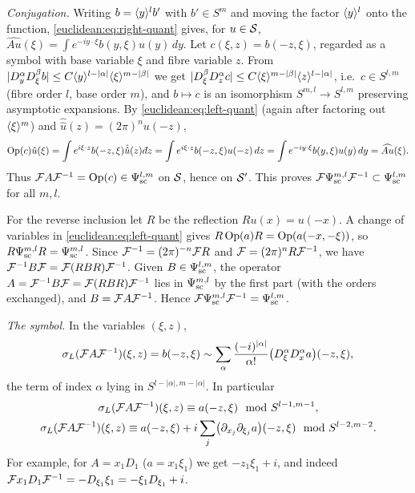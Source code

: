 \emph{Conjugation.} Writing $b=\langle y\rangle^lb'$ with $b'\in S^m$ and moving the
factor $\langle y\rangle^l$ onto the function, \eqref{euclidean:eq:right-quant} gives, for
$u\in\mathcal{S}$,
$\widehat{Au}(\xi)=\int e^{-iy\cdot\xi}b(y,\xi)u(y)\,dy$. Let $c(\xi,z)=b(-z,\xi)$,
regarded as a symbol with base variable $\xi$ and fibre variable $z$. From
$|D_y^\alpha D_\xi^\beta b|\le C\langle y\rangle^{l-|\alpha|}\langle \xi\rangle^{m-|\beta|}$ we get
$|D_\xi^\beta D_z^\alpha c|\le C\langle \xi\rangle^{m-|\beta|}\langle z\rangle^{l-|\alpha|}$, i.e.\
$c\in S^{l,m}$ (fibre order $l$, base order $m$), and $b\mapsto c$ is an
isomorphism $S^{m,l}\to S^{l,m}$ preserving asymptotic expansions. By
\eqref{euclidean:eq:left-quant} (again after factoring out $\langle \xi\rangle^m$) and
$\hat{\hat u}(z)=(2\pi)^nu(-z)$,
\begin{equation*}
  \Op(c)\hat u(\xi)=\int e^{i\xi\cdot z}b(-z,\xi)\hat{\hat u}(z)\,\dbar z
  =\int e^{i\xi\cdot z}b(-z,\xi)u(-z)\,dz=\int e^{-iy\cdot\xi}b(y,\xi)u(y)\,dy=\widehat{Au}(\xi).
\end{equation*}
Thus $\mathcal{F} A\mathcal{F}^{-1}=\operatorname{Op}(c)\in\Psi^{l,m}_{\mathrm{sc}}$ on $\mathcal{S}$, hence on $\mathcal{S}'$. This proves
$\mathcal{F}\Psi^{m,l}_{\mathrm{sc}}\mathcal{F}^{-1}\subset\Psi^{l,m}_{\mathrm{sc}}$ for all $m,l$.

For the reverse inclusion let $R$ be the reflection $Ru(x)=u(-x)$. A change of
variables in \eqref{euclidean:eq:left-quant} gives $R\operatorname{Op}(a)R=\operatorname{Op}(a(-x,-\xi))$, so
$R\Psi^{m,l}_{\mathrm{sc}}R=\Psi^{m,l}_{\mathrm{sc}}$. Since $\mathcal{F}^{-1}=(2\pi)^{-n}\mathcal{F} R$ and
$\mathcal{F}=(2\pi)^nR\mathcal{F}^{-1}$, we have $\mathcal{F}^{-1}B\mathcal{F}=\mathcal{F}(RBR)\mathcal{F}^{-1}$. Given
$B\in\Psi^{l,m}_{\mathrm{sc}}$, the operator $A=\mathcal{F}^{-1}B\mathcal{F}=\mathcal{F}(RBR)\mathcal{F}^{-1}$ lies in
$\Psi^{m,l}_{\mathrm{sc}}$ by the first part (with the orders exchanged), and
$B=\mathcal{F} A\mathcal{F}^{-1}$. Hence $\mathcal{F}\Psi^{m,l}_{\mathrm{sc}}\mathcal{F}^{-1}=\Psi^{l,m}_{\mathrm{sc}}$.

\emph{The symbol.} In the variables $(\xi,z)$,
\begin{equation*}
  \sigma_L(\mathcal{F} A\mathcal{F}^{-1})(\xi,z)=b(-z,\xi)\sim\sum_\alpha\frac{(-i)^{|\alpha|}}{\alpha!}\bigl(D_\xi^\alpha D_x^\alpha a\bigr)(-z,\xi),
\end{equation*}
the term of index $\alpha$ lying in $S^{l-|\alpha|,m-|\alpha|}$. In particular
\begin{gather*}
  \sigma_L(\mathcal{F} A\mathcal{F}^{-1})(\xi,z)\equiv a(-z,\xi)\mod S^{l-1,m-1},\\
  \sigma_L(\mathcal{F} A\mathcal{F}^{-1})(\xi,z)\equiv a(-z,\xi)+i\sum_j\bigl(\partial_{x_j}\partial_{\xi_j}a\bigr)(-z,\xi)\mod S^{l-2,m-2}.
\end{gather*}
For example, for $A=x_1D_1$ ($a=x_1\xi_1$) we get $-z_1\xi_1+i$, and indeed
$\mathcal{F} x_1D_1\mathcal{F}^{-1}=-D_{\xi_1}\xi_1=-\xi_1D_{\xi_1}+i$.

